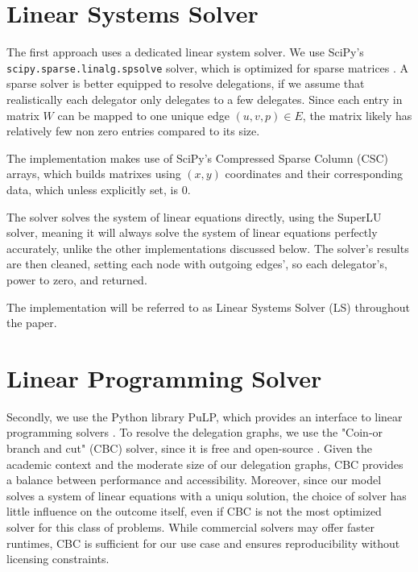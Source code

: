 \section{Linear Systems Solver}

The first approach uses a dedicated linear system solver. We use SciPy's \texttt{scipy.sparse\-.linalg.spsolve} solver, which is optimized for sparse matrices \cite{virtanenSciPy10Fundamental2020}. A sparse solver is better equipped to resolve delegations, if we assume that realistically each delegator only delegates to a few delegates. Since each entry in matrix $W$ can be mapped to one unique edge $(u, v, p) \in E$, the matrix likely has relatively few non zero entries compared to its size.
 
 The implementation makes use of SciPy's Compressed Sparse Column (CSC) arrays, which builds matrixes using $(x,y)$ coordinates and their corresponding data, which unless explicitly set, is 0. \cite{virtanenSciPy10Fundamental2020}

The solver solves the system of linear equations directly, using the SuperLU solver, meaning it will always solve the system of linear equations perfectly accurately, unlike the other implementations discussed below. \cite{liSuperLUUsersGuide1999} The solver's results are then cleaned, setting each node with outgoing edges', so each delegator's, power to zero, and returned.

The implementation will be referred to as Linear Systems Solver (LS) throughout the paper.

\section{Linear Programming Solver}

Secondly, we use the Python library PuLP, which provides an interface to linear programming solvers \cite{osullivanPuLPLinearProgramming2011}. To resolve the delegation graphs, we use the "Coin-or branch and cut" (CBC) solver, since it is free and open-source \cite{johnforrestCoinorCbcRelease2024}. Given the academic context and the moderate size of our delegation graphs, CBC provides a balance between performance and accessibility. Moreover, since our model solves a system of linear equations with a uniqu solution, the choice of solver has little influence on the outcome itself, even if CBC is not the most optimized solver for this class of problems. While commercial solvers may offer faster runtimes, CBC is sufficient for our use case and ensures reproducibility without licensing constraints.


